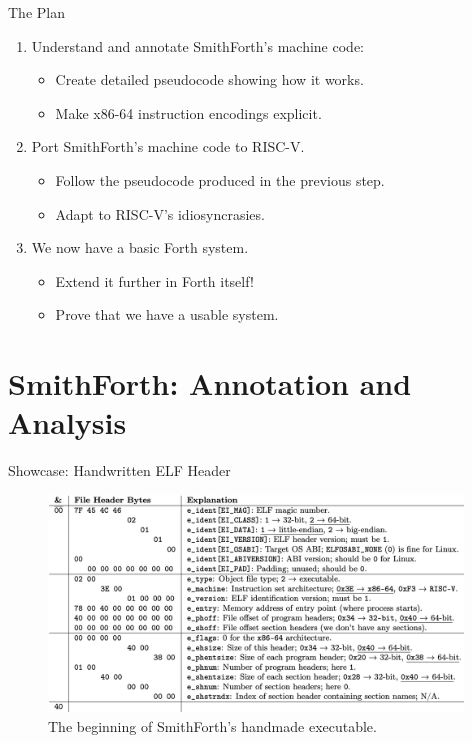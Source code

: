 \documentclass[presentation, bigger]{beamer}
\begin{document}
\begin{frame}[label={sec:orgcb25b1d}]{The Plan}
\begin{enumerate}
\item Understand and annotate SmithForth's machine code:
\begin{itemize}
\item Create detailed pseudocode showing how it works.
\item Make x86-64 instruction encodings explicit. \pause
\end{itemize}
\item Port SmithForth's machine code to RISC-V.
\begin{itemize}
\item Follow the pseudocode produced in the previous step.
\item Adapt to RISC-V's idiosyncrasies. \pause
\end{itemize}
\item We now have a basic Forth system.
\begin{itemize}
\item Extend it further in Forth itself!
\item Prove that we have a usable system.
\end{itemize}
\end{enumerate}
\end{frame}


\section{SmithForth: Annotation and Analysis}
\label{sec:org0be7aad}

\begin{frame}[label={sec:org220c53e}]{Showcase: Handwritten ELF Header}
\begin{figure}[htbp]
\centering
\includegraphics[width=0.98\textwidth]{img/presentation/elf-header.png}
\caption{The beginning of SmithForth's handmade executable.}
\end{figure}
\end{frame}
\end{document}

